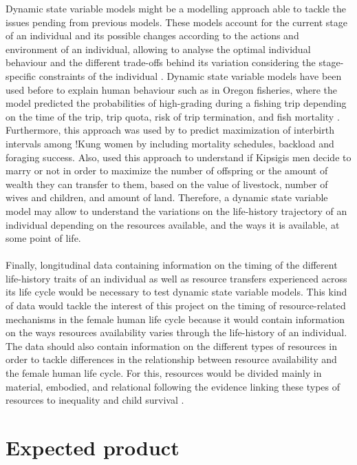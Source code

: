 \documentclass{article}
\begin{document}
Dynamic state variable models might be a modelling approach able to tackle the issues pending from previous models. These models account for the current stage of an individual and its possible changes according to the actions and environment of an individual, allowing to analyse the optimal individual behaviour and the different trade-offs behind its variation considering the stage-specific constraints of the individual \citep{houston1988dynamic,clark2000dynamic}. Dynamic state variable models have been used before to explain human behaviour such as in Oregon fisheries, where the model predicted the probabilities of high-grading during a fishing trip depending on the time of the trip, trip quota, risk of trip termination, and fish mortality \citep{gillis1995dynamic}. Furthermore, this approach was used by \cite{anderies1996adaptive} to predict maximization of interbirth intervals among !Kung women by including mortality schedules, backload and foraging success. Also, \cite{luttbeg2000marry} used this approach to understand if Kipsigis men decide to marry or not in order to maximize the number of offspring or the amount of wealth they can transfer to them, based on the value of livestock, number of wives and children, and amount of land. Therefore, a dynamic state variable model may allow to understand the variations on the life-history trajectory of an individual depending on the resources available, and the ways it is available, at some point of life.
\\\\
Finally, longitudinal data containing information on the timing of the different life-history traits of an individual as well as resource transfers experienced across its life cycle would be necessary to test dynamic state variable models. This kind of data would tackle the interest of this project on the timing of resource-related mechanisms in the female human life cycle because it would contain information on the ways resources availability  varies through the life-history of an individual. The data should also contain information on the different types of resources in order to tackle differences in the relationship between resource availability and the female human life cycle. For this, resources would be divided mainly in material, embodied, and relational following the evidence linking these types of resources to inequality and child survival \citep{mulder2009intergenerational,mulder2011understanding}.

\section{Expected product}
\end{document}
